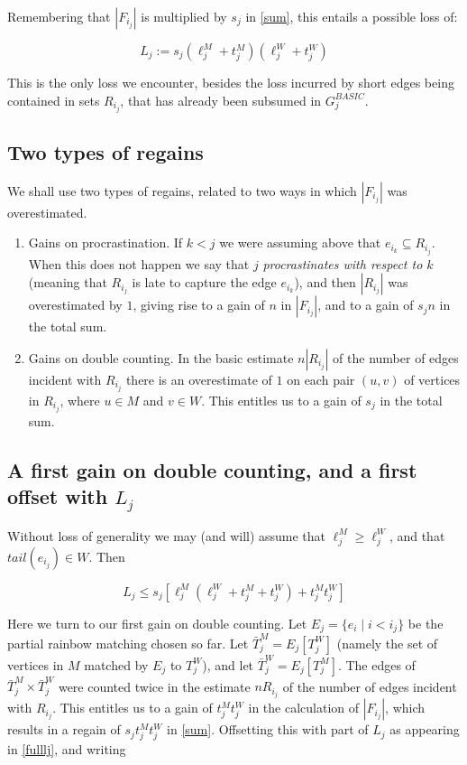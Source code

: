 \documentclass{amsart}
\theoremstyle{remark}
\newcommand{\lijm}{\ell_{j}^M}
\newcommand{\lijw}{\ell_{j}^W}
\newcommand{\eij}{e_{i_j}}
\newcommand{\eik}{e_{i_k}}
\newcommand{\rij}{R_{i_j}}
\newcommand{\Rij}{R_{i_j}}
\newcommand{\fij}{F_{i_j}}
\newcommand{\ljm}{{\ell}_{j}^M}
\newcommand{\ljw}{{\ell}_{j}^W}
\newcommand{\tjm}{t^M_j}
\newcommand{\tjw}{t^W_j}
\newcommand{\Twj}{T^W_j}
\newcommand{\btjw}{\bar{T}^W_j}
\newcommand{\btjm}{\bar{T}^M_j}
\begin{document}
  Remembering that  $|F_{i_j}|$ is multiplied by $s_j$ in \eqref{sum}, this
entails a possible loss of:




\begin{equation} \label{sjlambdaj}
L_j:=s_j(\lijm+t^M_j)(\lijw+\tjw)
\end{equation}


This is the only loss we encounter, besides the loss incurred by
short edges being contained in sets $\rij$, that has already been
subsumed in $G^{BASIC}_j$.




\subsection{Two types of regains}
We shall use two types of regains, related to two ways in which $|\fij|$
was overestimated.
\begin{enumerate}
\item
Gains on procrastination. If $k<j$ we were assuming above that $\eik
\subseteq R_{i_j}$. When this does not happen we say that $j$
{\em procrastinates with respect to $k$} (meaning that $\rij$ is late to capture the edge $\eik$), and then $|\Rij|$ was
overestimated by $1$, giving rise to a gain of $n$ in $|\fij|$, and
to a gain of $s_jn$ in the total sum.
\item
Gains on double counting. In the basic estimate $n|\rij|$ of the number
of edges incident with $\rij$ there is an overestimate of $1$ on
each pair $(u,v)$ of vertices in $\rij$, where $u \in M$ and $v \in
W$. This entitles us to a gain of $s_j$ in the total sum.
\end{enumerate}



\subsection{A first gain on double counting, and a first offset with $L_j$}\hfill

Without loss of generality we may (and will) assume that $\ljm \ge \ljw$, and
that $tail(\eij) \in W$. Then

\begin{equation}\label{fulllj}
L_j \le s_j[\ljm(\ljw+\tjm+\tjw)+\tjm\tjw]
\end{equation}

Here we turn to our first gain on double counting.
Let $E_j=\{e_i \mid i < i_j\}$ be the partial rainbow matching chosen so far. Let $\bar{T}^M_j=E_j[T^W_j]$ (namely the set of vertices in $M$ matched by $E_j$ to $\Twj$), and let $\bar{T}^W_j=E_j[T^M_j]$.
The edges of $\btjm \times \btjw$ were counted twice in the estimate $n\rij$ of the number of edges incident with $\rij$. This entitles us to a gain of $\tjm\tjw$ in the calculation of $|\fij|$, which results in a regain of $s_j\tjm\tjw$ in \eqref{sum}. Offsetting this with part of $L_j$ as appearing in \eqref{fulllj}, and writing
\end{document}
